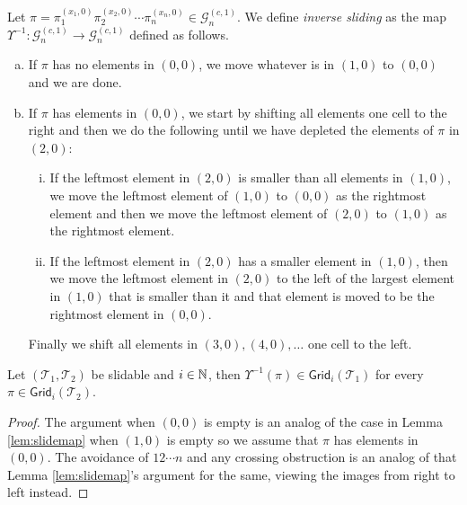 \begin{definition}
Let $\pi = \pi_1^{(x_1,0)}\pi_2^{(x_2,0)}\cdots\pi_n^{(x_n,0)} \in \mathcal{G}^{(c,1)}_n$. We define \emph{inverse sliding} as the map $\Upsilon^{-1}: \mathcal{G}^{(c,1)}_n \to \mathcal{G}^{(c,1)}_n$ defined as follows.
\begin{enumerate}[a)]
    \item If $\pi$ has no elements in $(0,0)$, we move whatever is in $(1,0)$ to $(0,0)$ and we are done.
    \item If $\pi$ has elements in $(0,0)$, we start by shifting all elements one cell to the right and then we do the following until we have depleted the elements of $\pi$ in $(2,0)$:
    \begin{enumerate}[i.]
        \item If the leftmost element in $(2,0)$ is smaller than all elements in $(1,0)$, we move the leftmost element of $(1,0)$ to $(0,0)$ as the rightmost element and then we move the leftmost element of $(2,0)$ to $(1,0)$ as the rightmost element.
        \item If the leftmost element in $(2,0)$ has a smaller element in $(1,0)$, then we move the leftmost element in $(2,0)$ to the left of the largest element in $(1,0)$ that is smaller than it and that element is moved to be the rightmost element in $(0,0)$.
    \end{enumerate}
    Finally we shift all elements in $(3,0), (4,0), \ldots$ one cell to the left.
\end{enumerate}
\end{definition}

\begin{lemma}
Let $(\mathcal{T}_1,\mathcal{T}_2)$ be slidable and $i \in \mathbb{N}$, then $\Upsilon^{-1}(\pi) \in \textsf{Grid}_i(\mathcal{T}_1)$ for every $\pi \in \textsf{Grid}_i(\mathcal{T}_2)$.
\end{lemma}
\begin{proof}
The argument when $(0,0)$ is empty is an analog of the case in Lemma \ref{lem:slidemap} when $(1,0)$ is empty so we assume that $\pi$ has elements in $(0,0)$. The avoidance of $12\cdots n$ and any crossing obstruction is an analog of that Lemma \ref{lem:slidemap}'s argument for the same, viewing the images from right to left instead.
\end{proof}

